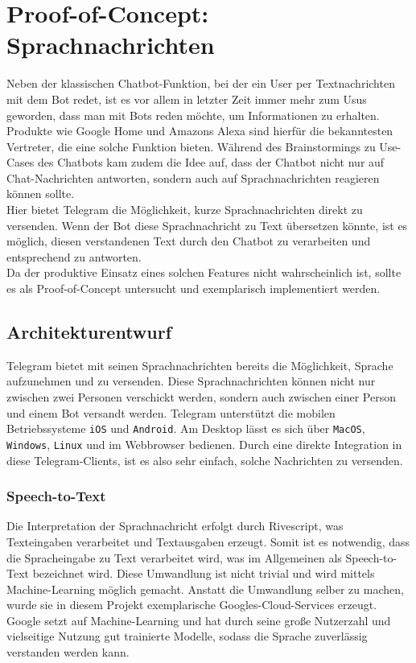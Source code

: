 \chapter{Proof-of-Concept: Sprachnachrichten}
Neben der klassischen Chatbot-Funktion, bei der ein User per Textnachrichten mit dem Bot redet, ist es vor allem in letzter Zeit immer mehr zum Usus geworden, dass man mit Bots reden möchte, um Informationen zu erhalten.  \\Produkte wie Google Home und Amazons Alexa sind hierfür die bekanntesten Vertreter, die eine solche Funktion bieten. Während des Brainstormings zu Use-Cases des Chatbots kam zudem die Idee auf, dass der Chatbot nicht nur auf Chat-Nachrichten antworten, sondern auch auf Sprachnachrichten reagieren können sollte. \\
Hier bietet Telegram die Möglichkeit, kurze Sprachnachrichten direkt zu versenden. Wenn der Bot diese Sprachnachricht zu Text übersetzen könnte, ist es möglich, diesen verstandenen Text durch den Chatbot zu verarbeiten und entsprechend zu antworten. \\
Da der produktive Einsatz eines solchen Features nicht wahrscheinlich ist, sollte es als Proof-of-Concept untersucht und exemplarisch implementiert werden.

\section{Architekturentwurf}
Telegram bietet mit seinen Sprachnachrichten bereits die Möglichkeit, Sprache aufzunehmen und zu versenden. Diese Sprachnachrichten können nicht nur zwischen zwei Personen verschickt werden, sondern auch zwischen einer Person und einem Bot versandt werden. Telegram unterstützt die mobilen Betriebssysteme \texttt{iOS} und \texttt{Android}. Am Desktop lässt es sich über \texttt{MacOS}, \texttt{Windows}, \texttt{Linux} und im Webbrowser bedienen. Durch eine direkte Integration in diese Telegram-Clients, ist es also sehr einfach, solche Nachrichten zu versenden.

\subsection{Speech-to-Text}
Die Interpretation der Sprachnachricht erfolgt durch Rivescript, was Texteingaben verarbeitet und Textausgaben erzeugt. Somit ist es notwendig, dass die Spracheingabe zu Text verarbeitet wird, was im Allgemeinen als Speech-to-Text bezeichnet wird. Diese Umwandlung ist nicht trivial und wird mittels Machine-Learning möglich gemacht. Anstatt die Umwandlung selber zu machen, wurde sie in diesem Projekt exemplarische Googles-Cloud-Services erzeugt. Google setzt auf Machine-Learning und hat durch seine große Nutzerzahl und vielseitige Nutzung gut trainierte Modelle, sodass die Sprache zuverlässig verstanden werden kann.

